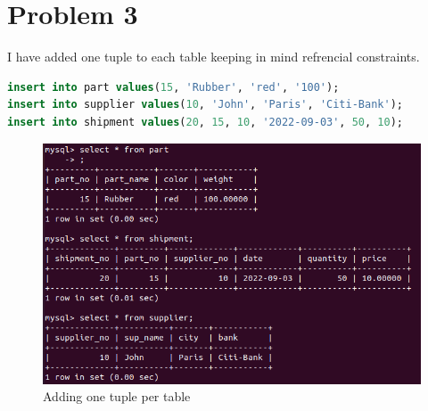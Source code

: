 \documentclass{article}
\begin{document}
\section{Problem 3}
I have added one tuple to each table keeping in mind refrencial constraints.
\begin{lstlisting}[language=sql]
insert into part values(15, 'Rubber', 'red', '100');
insert into supplier values(10, 'John', 'Paris', 'Citi-Bank');
insert into shipment values(20, 15, 10, '2022-09-03', 50, 10);
\end{lstlisting}
\begin{figure}[!ht]
  \begin{center}
  \includegraphics[scale=1]{added_one_tuple.png}
  \caption{Adding one tuple per table}
  \end{center}
\end{figure}

\newpage
\end{document}
